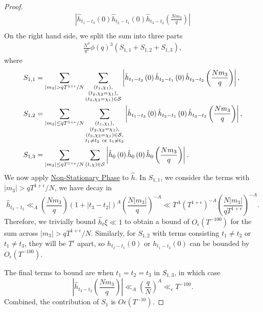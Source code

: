 \begin{proof}
\begin{align*}
   \left|\hat{h}_{t_1-t_3}\left(0\right)\hat{h}_{t_2-t_1}\left(0\right)\hat{h}_{t_3-t_2}\left(\frac{Nm_3}{q}\right)\right|\\
\end{align*}
On the right hand side, we split the sum into three parts \begin{align*}
    \frac{N^3}{q^3}\phi(q)^3(S_{1,1}+S_{1,2}+S_{1,3}),
\end{align*}
where \begin{align*}
    S_{1,1}&= \sum_{|m_3|>qT^{1+\epsilon}/N}\sum_{\substack{(t_1,\chi_1),\\(t_2,\chi_2=\chi_1),\\(t_3,\chi_3=\chi_1)\in\mathcal{S}}}
    \left|\hat{h}_{t_1-t_3}\left(0\right)\hat{h}_{t_2-t_1}\left(0\right)\hat{h}_{t_3-t_2}\left(\frac{Nm_3}{q}\right)\right|,\\
    S_{1,2}&=  \sum_{|m_3|\leq qT^{1+\epsilon}/N}\sum_{\substack{(t_1,\chi_1),\\(t_2,\chi_2=\chi_1),\\(t_3,\chi_3=\chi_1)\in\mathcal{S},\\ t_1\neq t_2 \ \rm{or} \ t_1\neq t_3}}
    \left|\hat{h}_{t_1-t_3}\left(0\right)\hat{h}_{t_2-t_1}\left(0\right)\hat{h}_{t_3-t_2}\left(\frac{Nm_3}{q}\right)\right|,\\
    S_{1,3}&= \sum_{|m_3|\leq qT^{1+\epsilon}/N}\sum_{(t,\chi)\in\mathcal{S}}
    \left|\hat{h}_{0}\left(0\right)\hat{h}_{0}\left(0\right)\hat{h}_{0}\left(\frac{Nm_3}{q}\right)\right|.
\end{align*}
We now apply \hyperref[nonstationary]{Non-Stationary Phase} to $\hat{h}$. In $S_{1,1}$, we consider the terms with $|m_3|>qT^{1+\epsilon}/N$, we have decay in \[
    \hat{h}_{t_3-t_2}\ll_{A}\left(\frac{Nm_3}{q}\right)\left(1+|t_3-t_2|\right)^A\left(\frac{N|m_3|}{q}\right)^{-A} \ll T^A \left(T^{1+\epsilon}\right)^{-A} \left(\frac{N|m_3|}{qT^{1+\epsilon}}\right)^{-A}.
\] Therefore, we trivially bound $\hat{h}_t{\xi}\ll 1$ to obtain a bound of $O_\epsilon(T^{-100})$ for the sum across $|m_3|>qT^{1+\epsilon}/N$.
Similarly, for $S_{1,2}$  with terms consisting $t_1\neq t_2$ or $t_1\neq t_3$, they will be $T^\epsilon$ apart, so $h_{t_2-t_1}(0)$ or $h_{t_1-t_3}(0)$ can be bounded by $O_{\epsilon}(T^{-100})$.

The final terms to bound are when $t_1=t_2=t_3$ in $S_{1,3}$, in which case \[
    \left|\hat{h}_{t_3-t_2}\left(\frac{Nm_3}{q}\right)\right| \ll_{A} \left(\frac{q}{N}\right)^{A}\ll_{\epsilon} T^{-100}.
\]
Combined, the contribution of $S_1$ is $O\epsilon(T^{-10})$.

\end{proof}


